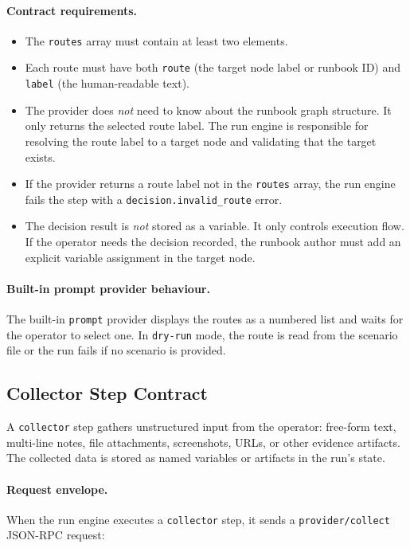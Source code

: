\paragraph{Contract requirements.}
\begin{itemize}
  \item The \texttt{routes} array must contain at least two elements.
  \item Each route must have both \texttt{route} (the target node label or
        runbook ID) and \texttt{label} (the human-readable text).
  \item The provider does \emph{not} need to know about the runbook graph
        structure.  It only returns the selected route label.  The run engine
        is responsible for resolving the route label to a target node and
        validating that the target exists.
  \item If the provider returns a route label not in the \texttt{routes} array,
        the run engine fails the step with a \texttt{decision.invalid\_route}
        error.
  \item The decision result is \emph{not} stored as a variable.  It only
        controls execution flow.  If the operator needs the decision recorded,
        the runbook author must add an explicit variable assignment in the
        target node.
\end{itemize}

\paragraph{Built-in prompt provider behaviour.}
The built-in \texttt{prompt} provider displays the routes as a numbered list
and waits for the operator to select one.  In \texttt{dry-run} mode, the route
is read from the scenario file or the run fails if no scenario is provided.

\subsection{Collector Step Contract}
\label{subsec:collector-contract}

A \texttt{collector} step gathers unstructured input from the operator: free-form
text, multi-line notes, file attachments, screenshots, URLs, or other evidence
artifacts.  The collected data is stored as named variables or artifacts in the
run's state.

\paragraph{Request envelope.}
When the run engine executes a \texttt{collector} step, it sends a
\texttt{provider/collect} JSON-RPC request:


